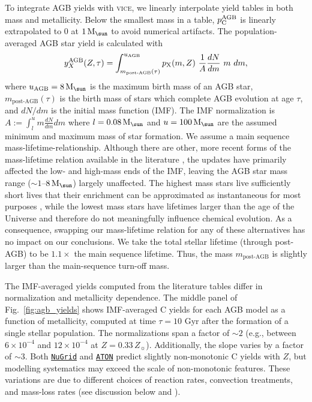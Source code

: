 \documentclass[fleqn,
usenatbib]{mnras}
\newcommand{\VICE}{\textsc{vice}}
\newcommand{\nugrid}{\texttt{\hyperlink{nugrid}{NuGrid}}}
\newcommand{\aton}{\texttt{\hyperlink{aton}{ATON}}}
\newcommand{\ycagb}{\y_{\rm C}^{\rm AGB}}
\newcommand{\y}{p}
\newcommand{\Mo}{ {\rm M}_{\sun}}
\newcommand{\Zo}{ Z_{\sun}}
\newcommand{\about}[1]{${\sim} #1$}
\begin{document}
To integrate AGB yields with \VICE, we linearly interpolate yield tables in both mass and metallicity. Below the smallest mass in a table, $\ycagb$ is linearly extrapolated to 0 at $1\,\Mo$ to avoid numerical artifacts. The population-averaged AGB star yield is calculated with 
\begin{equation} \label{eq:imf-agb-yield}
    y_{X}^{\rm AGB}(Z,\tau) = 
    \int^{u_{\rm AGB}}_{m_\textrm{post-AGB}(\tau)} 
    \y_{\rm X}(m, Z)\ 
    \frac{1}{A}\frac{dN}{dm}\ m\ dm ,
\end{equation}
where $u_{\rm AGB}=8\,\Mo$ is the maximum birth mass of an AGB star, $m_\textrm{post-AGB}(\tau)$ is the birth mass of stars which complete AGB evolution at age $\tau$, and $dN/dm$ is the initial mass function (IMF). The IMF normalization is $
    A := \int_l^u m \frac{dN}{dm} dm
$
where  $l=0.08\,\Mo$ and $u = 100\,\Mo$ are the assumed minimum and maximum mass of star formation. We assume a \citet{larson74} main sequence mass-lifetime-relationship. 
Although there are other, more recent forms of the mass-lifetime relation available in the literature \citep[e.g.,][]{hurley+2000, vincenzo+2016}, the updates have primarily affected the low- and high-mass ends of the IMF, leaving the AGB star mass range (${\sim}1$--$8\,\Mo$) largely unaffected. The highest mass stars live sufficiently short lives that their enrichment can be approximated as instantaneous for most purposes \citep[see discussion in, e.g.,][]{WAF17}, while the lowest mass stars have lifetimes larger than the age of the Universe and therefore do not meaningfully influence chemical evolution. As a consequence, swapping our mass-lifetime relation for any of these alternatives has no impact on our conclusions. 
We take the total stellar lifetime (through post-AGB) to be $1.1\times$ the main sequence lifetime. Thus, the mass $m_\textrm{post-AGB}$ is slightly larger than the main-sequence turn-off mass.


The IMF-averaged yields computed from the literature tables differ in normalization and metallicity dependence.  
The middle panel of Fig.~\ref{fig:agb_yields} shows IMF-averaged C yields for each AGB model as a function of metallicity, computed at time $\tau = 10$ Gyr after the formation of a single stellar population.
The normalizations span a factor of \about{2} (e.g., between $6\times 10^{-4}$ and $12 \times 10^{-4}$ at $Z=0.33\,\Zo$).
Additionally, the slope varies by a factor of ${\sim}3$.
Both \nugrid{} and \aton{} predict slightly non-monotonic C yields with $Z$, but modelling systematics may exceed the scale of non-monotonic features.
These variations are due to different choices of reaction rates, convection treatments, and mass-loss rates (see discussion below and \citealt{james+23}).
\end{document}
